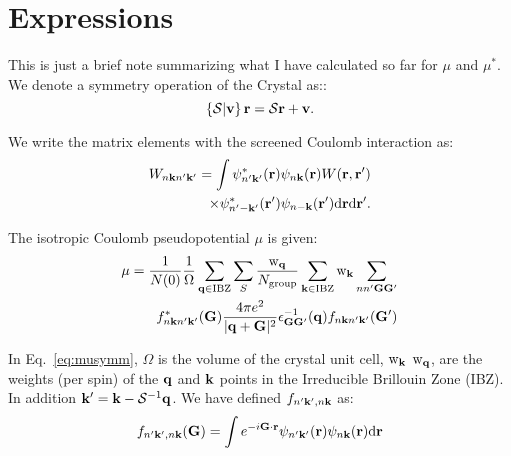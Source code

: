 \documentclass{article}
\def\q{{\bf q}}
\def\k{{\bf k}}
\def\G{{\bf G}}
\def\rb{{\bf r}}
\def\rp{{\bf r^\prime}}
\def\S{\mathcal{S}}
\def\v{\mathbf{v}}
\def\symm{\left\{\mathcal{S}|\mathbf{v}\right\}}
\begin{document}
\section{Expressions}
This is just a brief note summarizing what I have
calculated so far for $\mu$ and $\mu^{*}$.
We denote a symmetry operation of the Crystal as::
%
\begin{equation}
  \label{eq:symmoperation}
  \symm\rb = \S\rb + \v.
\end{equation}

We write the matrix elements with the screened Coulomb interaction as:
%
\begin{eqnarray}
\label{eq:coulmat}
W_{n\k n'\k'} = \int \psi^{*}_{n'\k'}(\rb)\psi_{n\k}(\rb)W(\rb,\rp) \nonumber\\
\times\psi^{*}_{n'-\k'}(\rp)\psi_{n-\k}(\rp) \rm{d}\rb \rm{d}\rp.
\end{eqnarray}


The isotropic Coulomb pseudopotential $\mu$ is given:
%
\begin{eqnarray}
\label{eq:musymm}
\mu =\frac{1}{N(0)}\frac{1}{\Omega}\sum_{\q\in{\rm IBZ}}\sum_{S}
\frac{{\rm w}_{\q}}{N_{\rm group}}\sum_{\k\in {\rm IBZ}}\nonumber{\rm w}_{\k}\sum_{n n' \G \G'}\\ 
f^{*}_{n\k n'\k'}(\G)\frac{4\pi e^{2}}{|\q+\G|^{2}}
\epsilon_{\G\G'}^{-1}(\q)f_{n\k n'\k'}(\G')
\end{eqnarray}
%

In Eq.~\ref{eq:musymm}, $\Omega$ is the volume of the crystal unit cell, 
$\rm{w}_{\k}$ $\rm{w}_{\q}$, are the weights (per spin) of the $\q$ and $\k$ 
points in the Irreducible Brillouin Zone (IBZ). In addition $\k'=\k-\S^{-1}\q$.
We have defined $f_{n'\k',n\k}$ as:
%
\begin{equation}
f_{n'\k',n\k}(\G) = \int e^{-i\G\cdot\rb} \psi_{n'\k'}(\rb)\psi_{n\k}(\rb) \rm{d}\rb
\end{equation}

%
\end{document}
